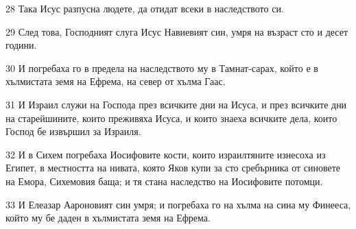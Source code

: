 \par 28 Така Исус разпусна людете, да отидат всеки в наследството си.
\par 29 След това, Господният слуга Исус Навиевият син, умря на възраст сто и десет години.
\par 30 И погребаха го в предела на наследството му в Тамнат-сарах, който е в хълмистата земя на Ефрема, на север от хълма Гаас.
\par 31 И Израил служи на Господа през всичките дни на Исуса, и през всичките дни на старейшините, които преживяха Исуса, и които знаеха всичките дела, които Господ бе извършил за Израиля.
\par 32 И в Сихем погребаха Иосифовите кости, които израилтяните изнесоха из Египет, в местността на нивата, която Яков купи за сто сребърника от синовете на Емора, Сихемовия баща; и тя стана наследство на Иосифовите потомци.
\par 33 И Елеазар Аароновият син умря; и погребаха го на хълма на сина му Финееса, който му бе даден в хълмистата земя на Ефрема.

